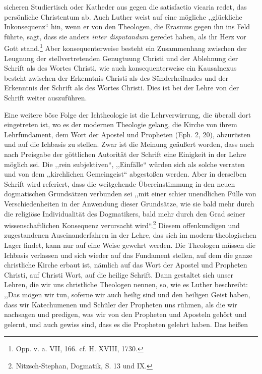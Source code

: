 sicheren Studiertisch oder Katheder aus gegen die satisfactio vicaria redet, das persönliche Christentum ab. Auch Luther weist auf eine mögliche ,,glückliche Inkonsequenz`` hin, wenn er von den Theologen, die Erasmus gegen ihn ins Feld führte, sagt, dass sie anders \emph{inter disputandum} geredet haben, als ihr Herz vor Gott stand.\footnote{Opp. v. a. VII, 166. cf. H. XVIII, 1730.} Aber konsequenterweise besteht ein Zusammenhang zwischen der Leugnung der stellvertretenden Genugtuung Christi und der Ablehnung der Schrift als des Wortes Christi, wie auch konsequenterweise ein Kausalnexus besteht zwischen der Erkenntnis Christi als des Sünderheilandes und der Erkenntnis der Schrift als des Wortes Christi. Dies ist bei der Lehre von der Schrift weiter auszuführen.\par

Eine weitere böse Folge der Ichtheologie ist die Lehrverwirrung, die überall dort eingetreten ist, wo es der modernen Theologie gelang, die Kirche von ihrem Lehrfundament, dem Wort der Apostel und Propheten (Eph. 2, 20), abzurüsten und auf die Ichbasis zu stellen. Zwar ist die Meinung geäußert worden, dass auch nach Preisgabe der göttlichen Autorität der Schrift eine Einigkeit in der Lehre möglich sei. Die ,,rein subjektiven``, ,,Einfälle`` würden sich als solche verraten und von dem ,,kirchlichen Gemeingeist`` abgestoßen werden. Aber in derselben Schrift wird referiert, dass die weitgehende Übereinstimmung in den neuen dogmatischen Grundsätzen verbunden sei ,,mit einer schier unendlichen Fülle von Verschiedenheiten in der Anwendung dieser Grundsätze, wie sie bald mehr durch die religiöse Individualität des Dogmatikers, bald mehr durch den Grad seiner wissenschaftlichen Konsequenz verursacht wird``.\footnote{Nitzsch-Stephan, Dogmatik, S. 13 und IX.} Diesem offenkundigen und zugestandenen Auseinanderfahren in der Lehre, das sich im modern-theologischen Lager findet, kann nur auf eine Weise gewehrt werden. Die Theologen müssen die Ichbasis verlassen und sich wieder auf das Fundament stellen, auf dem die ganze christliche Kirche erbaut ist, nämlich auf das Wort der Apostel und Propheten Christi, auf Christi Wort, auf die heilige Schrift. Dann gestaltet sich unser Lehren, die wir uns christliche Theologen nennen, so, wie es Luther beschreibt: ,,Das mögen wir tun, soferne wir auch heilig sind und den heiligen Geist haben, dass wir Katechumenen und Schüler der Propheten uns rühmen, als die wir nachsagen und predigen, was wir von den Propheten und Aposteln gehört und gelernt, und auch gewiss sind, dass es die Propheten gelehrt haben. Das heißen